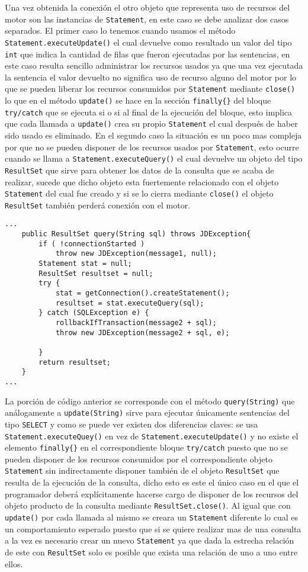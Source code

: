 Una vez obtenida la conexión el otro objeto que representa uso de recursos del motor son las instancias de \verb=Statement=, en este caso se debe analizar dos casos separados. El primer caso lo tenemos cuando usamos el método \verb=Statement.executeUpdate()= el cual devuelve como resultado un valor del tipo \verb=int= que indica la cantidad de filas que fueron ejecutadas por las sentencias, en este caso resulta sencillo administrar los recursos usados ya que una vez ejecutada la sentencia el valor devuelto no significa uso de recurso alguno del motor por lo que se pueden liberar los recursos consumidos por \verb=Statement= mediante \verb=close()= lo que en el método \verb=update()= se hace en la sección \verb=finally{}= del bloque \verb=try/catch= que se ejecuta si o si al final de la ejecución del bloque, esto implica que cada llamada a \verb=update()= crea su propio \verb=Statement= el cual después de haber sido usado es eliminado. En el segundo caso la situación es un poco mas compleja por que no se pueden disponer de los recursos usados por \verb=Statement=, esto ocurre cuando se llama a \verb=Statement.executeQuery()= el cual devuelve un objeto del tipo \verb=ResultSet= que sirve para obtener los datos de la consulta que se acaba de realizar, sucede que dicho objeto esta fuertemente relacionado con el objeto \verb=Statement= del cual fue creado y si se lo cierra mediante \verb=close()= el objeto \verb=ResultSet= también perderá conexión con el motor.
%
\begin{lstlisting}[title=función extraída de JDBCManager]
...
	public ResultSet query(String sql) throws JDException{
		if ( !connectionStarted ) 
			throw new JDException(message1, null);
		Statement stat = null;
		ResultSet resultset = null;
		try {
			stat = getConnection().createStatement();
			resultset = stat.executeQuery(sql);
		} catch (SQLException e) {
			rollbackIfTransaction(message2 + sql);
			throw new JDException(message2 + sql, e);

		}
		return resultset;
	}
...
\end{lstlisting}
%
La porción de código anterior se corresponde con el método \verb=query(String)= que análogamente a \verb=update(String)= sirve para ejecutar únicamente sentencias del tipo \verb=SELECT= y como se puede ver existen dos diferencias claves: se usa \verb=Statement.executeQuey()= en vez de \verb=Statement.executeUpdate()= y no existe el elemento \verb=finally{}= en el correspondiente bloque \verb=try/catch= puesto que no se pueden disponer de los recursos consumidos por el correspondiente objeto \verb=Statement= sin indirectamente disponer también de el objeto \verb=ResultSet= que resulta de la ejecución de la consulta, dicho esto es este el único caso en el que el programador deberá explícitamente hacerse cargo de disponer de los recursos del objeto producto de la consulta mediante \verb=ResultSet.close()=. Al igual que con \verb=update()= por cada llamada al mismo se creara un \verb=Statement= diferente lo cual es un comportamiento esperado puesto que si se quiere realizar mas de una consulta a la vez es necesario crear un nuevo \verb=Statement= ya que dada la estrecha relación de este con \verb=ResultSet= solo es posible que exista una relación de uno a uno entre ellos.

